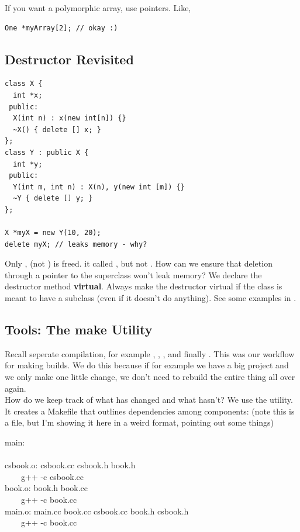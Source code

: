 \documentclass[english, 11pt]{article}
\begin{document}
If you want a polymorphic array, use pointers. Like,
\begin{lstlisting}
One *myArray[2]; // okay :)
\end{lstlisting}


\subsection{Destructor Revisited}
\begin{lstlisting}
class X {
  int *x;
 public:
  X(int n) : x(new int[n]) {}
  ~X() { delete [] x; }
};
class Y : public X {
  int *y;
 public:
  Y(int m, int n) : X(n), y(new int [m]) {}
  ~Y { delete [] y; }
};

X *myX = new Y(10, 20);
delete myX; // leaks memory - why?
\end{lstlisting}
Only , (not ) is freed. it called , but not . How can we ensure that deletion through a pointer to the superclass won't leak memory? We declare the destructor method \textbf{virtual}. Always make the destructor virtual if the class is meant to have a subclass (even if it doesn't do anything). See some examples in .

\subsection{Tools: The make Utility}

Recall seperate compilation, for example , , , and finally . This was our workflow for making builds. We do this because if for example we have a big project and we only make one little change, we don't need to rebuild the entire thing all over again. \\

How do we keep track of what has changed and what hasn't? We use the  utility. It creates a Makefile that outlines dependencies among components: (note this is a file, but I'm showing it here in a weird format, pointing out some things)

  main:  \\
         \\
  csbook.o: csbook.cc csbook.h book.h \\
  \ \ \ \ g++ -c csbook.cc \\
book.o: book.h book.cc \\
  \ \ \ \ g++ -c book.cc \\
  main.o: main.cc  book.cc csbook.cc book.h csbook.h \\
  \ \ \ \ g++ -c book.cc \\
\end{document}
